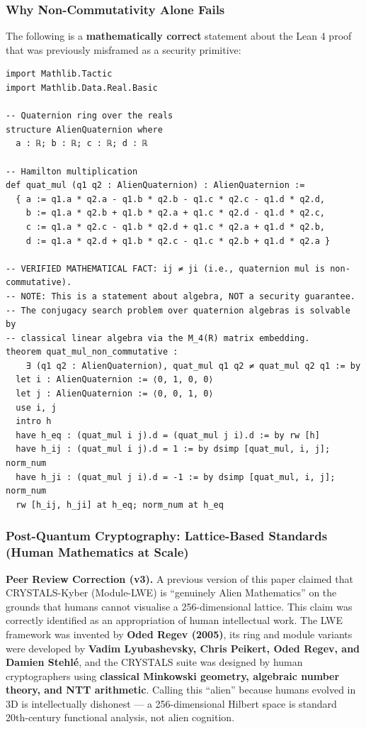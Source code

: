 \documentclass[11pt, a4paper]{article}
\begin{document}
\subsubsection{Why Non-Commutativity Alone Fails}
The following is a \textbf{mathematically correct} statement about the Lean 4 proof that was previously misframed as a security primitive:

\begin{lstlisting}[language=Lean, caption=Non-Commutativity as a Mathematical Fact (Not a Security Claim), label=lst:lean_crypto]
import Mathlib.Tactic
import Mathlib.Data.Real.Basic

-- Quaternion ring over the reals
structure AlienQuaternion where
  a : ℝ; b : ℝ; c : ℝ; d : ℝ

-- Hamilton multiplication
def quat_mul (q1 q2 : AlienQuaternion) : AlienQuaternion :=
  { a := q1.a * q2.a - q1.b * q2.b - q1.c * q2.c - q1.d * q2.d,
    b := q1.a * q2.b + q1.b * q2.a + q1.c * q2.d - q1.d * q2.c,
    c := q1.a * q2.c - q1.b * q2.d + q1.c * q2.a + q1.d * q2.b,
    d := q1.a * q2.d + q1.b * q2.c - q1.c * q2.b + q1.d * q2.a }

-- VERIFIED MATHEMATICAL FACT: ij ≠ ji (i.e., quaternion mul is non-commutative).
-- NOTE: This is a statement about algebra, NOT a security guarantee.
-- The conjugacy search problem over quaternion algebras is solvable by
-- classical linear algebra via the M_4(R) matrix embedding.
theorem quat_mul_non_commutative :
    ∃ (q1 q2 : AlienQuaternion), quat_mul q1 q2 ≠ quat_mul q2 q1 := by
  let i : AlienQuaternion := ⟨0, 1, 0, 0⟩
  let j : AlienQuaternion := ⟨0, 0, 1, 0⟩
  use i, j
  intro h
  have h_eq : (quat_mul i j).d = (quat_mul j i).d := by rw [h]
  have h_ij : (quat_mul i j).d = 1 := by dsimp [quat_mul, i, j]; norm_num
  have h_ji : (quat_mul j i).d = -1 := by dsimp [quat_mul, i, j]; norm_num
  rw [h_ij, h_ji] at h_eq; norm_num at h_eq
\end{lstlisting}

\subsubsection{Post-Quantum Cryptography: Lattice-Based Standards (Human Mathematics at Scale)}

\textbf{\color{red}Peer Review Correction (v3).} A previous version of this paper claimed that CRYSTALS-Kyber (Module-LWE) is ``genuinely Alien Mathematics'' on the grounds that humans cannot visualise a 256-dimensional lattice. This claim was correctly identified as an appropriation of human intellectual work. The LWE framework was invented by \textbf{Oded Regev (2005)}, its ring and module variants were developed by \textbf{Vadim Lyubashevsky, Chris Peikert, Oded Regev, and Damien Stehlé}, and the CRYSTALS suite was designed by human cryptographers using \textbf{classical Minkowski geometry, algebraic number theory, and NTT arithmetic}. Calling this ``alien'' because humans evolved in 3D is intellectually dishonest --- a 256-dimensional Hilbert space is standard 20th-century functional analysis, not alien cognition.
\end{document}
